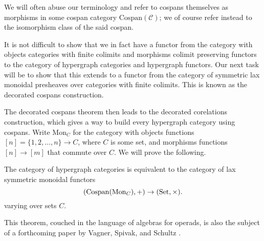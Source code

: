 We will often abuse our terminology and refer to cospans themselves as
morphisms in some cospan category $\mathrm{Cospan}(\mathcal C)$; we of course
refer instead to the isomorphism class of the said cospan.
 
It is not difficult to show that we in fact have a functor from the category
with objects categories with finite colimits and morphisms colimit preserving
functors to the category of hypergraph categories and hypergraph functors. Our
next task will be to show that this extends to a functor from the category of
symmetric lax monoidal presheaves over categories with finite colimits. This is
known as the decorated cospans construction.


The decorated cospans theorem then leads to the decorated corelations
construction, which gives a way to build every hypergraph category using
cospans. Write $\mathrm{Mon}_C$ for the category with objects functions $[n]=\{1,2,
\dots,n \} \to C$, where $C$ is some set, and morphisms functions $[n] \to [m]$
that commute over $C$. We will prove the following.
\begin{theorem}
  The category of hypergraph categories is equivalent to the category of
  lax symmetric monoidal functors
  \[
    (\mathrm{Cospan}(\mathrm{Mon}_C),+) \to (\mathrm{Set},\times).
  \]
  varying over sets $C$.
\end{theorem}
This theorem, couched in the language of algebras for operads, is also the
subject of a forthcoming paper by Vagner, Spivak, and Schultz \cite{VagSpiSch}.



